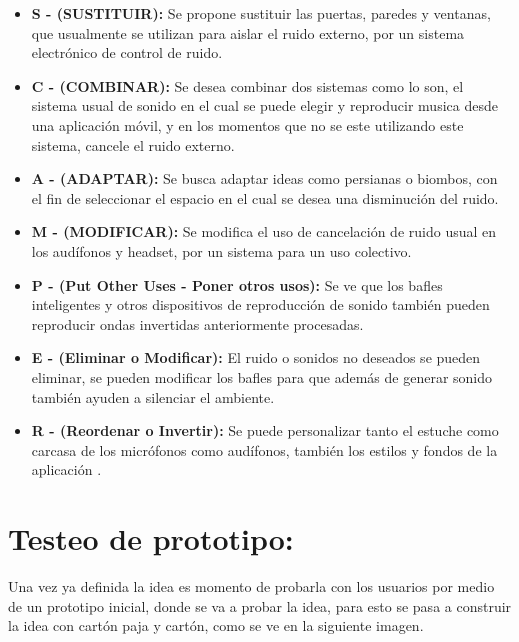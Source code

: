 \documentclass[conference,compsoc,onecolumn]{IEEEtran}
\begin{document}
\begin{itemize}
    \item \textbf{S - (SUSTITUIR): } Se propone sustituir las puertas, paredes y ventanas, que usualmente se utilizan para aislar el ruido externo, por un sistema electrónico de control de ruido.\\
    \item \textbf{C - (COMBINAR): } Se desea combinar dos sistemas como lo son, el sistema usual de sonido en el cual se puede elegir y reproducir musica desde una aplicación móvil, y en los momentos que no se este utilizando este sistema, cancele el ruido externo.\\
    \item \textbf{A - (ADAPTAR): } Se busca adaptar ideas como persianas o biombos, con el fin de seleccionar el espacio en el cual se desea una disminución del ruido.\\
    \item \textbf{M - (MODIFICAR): } Se modifica el uso de cancelación de ruido usual en los audífonos y headset, por un sistema para un uso colectivo.\\
    
    \item \textbf{P - (Put Other Uses - Poner otros usos): } Se ve que los bafles inteligentes y otros dispositivos de reproducción de sonido también pueden reproducir ondas invertidas anteriormente procesadas.\\

    \item \textbf{E - (Eliminar o Modificar): } El ruido o sonidos no deseados se pueden eliminar, se pueden modificar los bafles para que además de generar sonido también ayuden a silenciar el ambiente.\\
    
    \item \textbf{R - (Reordenar o Invertir): } Se puede personalizar tanto el estuche como carcasa de los micrófonos como audífonos, también los estilos y fondos de la aplicación .\\
    
    
\end{itemize}


\section{Testeo de prototipo:}
Una vez ya definida la idea es momento de probarla con los usuarios por medio de un prototipo inicial, donde se va a probar la idea, para esto se pasa a construir la idea con cartón paja y cartón, como se ve en la siguiente imagen.
\end{document}
